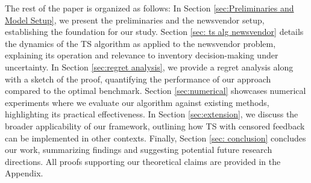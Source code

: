 The rest of the paper is organized as follows: In Section \ref{sec:Preliminaries and Model Setup}, we present the preliminaries and the newsvendor setup, establishing the foundation for our study. Section \ref{sec: ts alg newsvendor} details the dynamics of the TS algorithm as applied to the newsvendor problem, explaining its operation and relevance to inventory decision-making under uncertainty. In Section \ref{sec:regret analysis}, we provide a regret analysis along with a sketch of the proof, quantifying the performance of our approach compared to the optimal benchmark. Section \ref{sec:numerical} showcases numerical experiments where we evaluate our algorithm against existing methods, highlighting its practical effectiveness. In Section \ref{sec:extension}, we discuss the broader applicability of our framework, outlining how TS with censored feedback can be implemented in other contexts. Finally, Section \ref{sec: conclusion} concludes our work, summarizing findings and suggesting potential future research directions. All proofs supporting our theoretical claims are provided in the Appendix.
